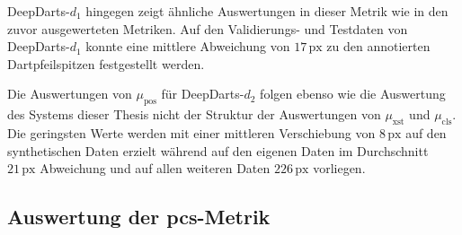 DeepDarts-$d_1$ hingegen zeigt ähnliche Auswertungen in dieser Metrik wie in den zuvor ausgewerteten Metriken. Auf den Validierungs- und Testdaten von DeepDarts-$d_1$ konnte eine mittlere Abweichung von $17\,\text{px}$ zu den annotierten Dartpfeilspitzen festgestellt werden.

Die Auswertungen von $\mu_\text{pos}$ für DeepDarts-$d_2$ folgen ebenso wie die Auswertung des Systems dieser Thesis nicht der Struktur der Auswertungen von $\mu_\text{xst}$ und $\mu_\text{cls}$. Die geringsten Werte werden mit einer mittleren Verschiebung von $8\,\text{px}$ auf den synthetischen Daten erzielt während auf den eigenen Daten im Durchschnitt $21\,\text{px}$ Abweichung und auf allen weiteren Daten $226\,\text{px}$ vorliegen.


\subsection{Auswertung der \acs{pcs}-Metrik}
\label{sec:auswertung_pcs}

\NNPCS

